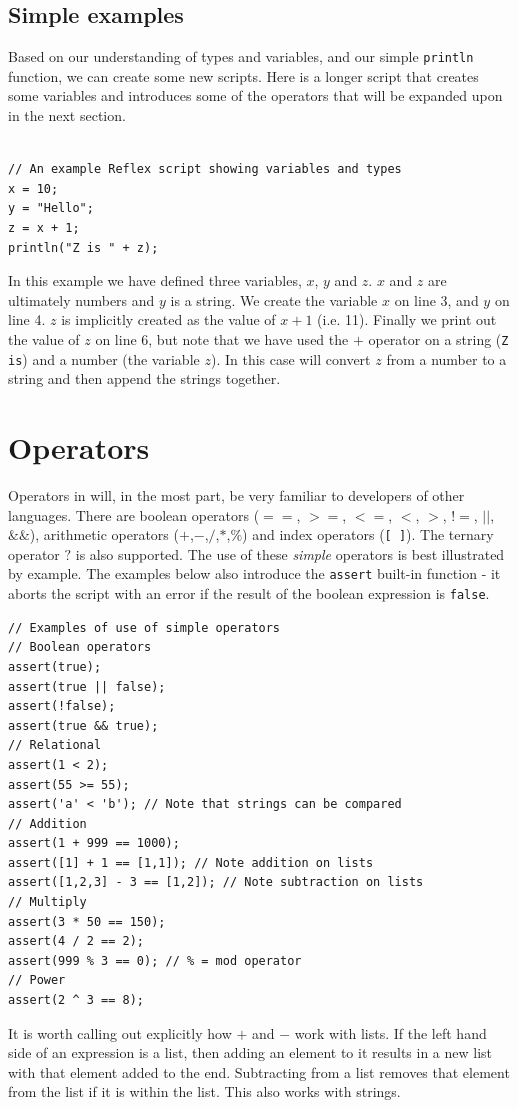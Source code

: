 \section{Simple examples}
Based on our understanding of types and variables, and our simple \verb+println+ function, we can create some new \Reflex scripts. Here is a longer script that creates some variables and introduces some of the operators that will be expanded upon in the next section.

\begin{lstlisting}[caption={Variables and Types}]

// An example Reflex script showing variables and types
x = 10;
y = "Hello";
z = x + 1;
println("Z is " + z);
\end{lstlisting}

In this example we have defined three variables, $x$, $y$ and $z$. $x$ and $z$ are ultimately numbers and $y$ is a string. We create the variable $x$ on line 3, and $y$ on line 4. $z$ is implicitly created as the value of $x+1$ (i.e. 11). Finally we print out the value of $z$ on line 6, but note that we have used the $+$ operator on a string (\verb+Z is+) and a number (the variable $z$). In this case \Reflex will convert $z$ from a number to a string and then append the strings together.

\chapter{Operators}
Operators  in \Reflex will, in the most part, be very familiar to developers of other languages. There are boolean  operators ($==$, $>=$, $<=$, $<$, $>$, $!=$, $||$, $\&\&$), arithmetic  operators ($+$,$-$,$/$,$*$,$\%$) and index  operators (\verb+[ ]+). The ternary  operator $?$ is also supported. The use of these \emph{simple} operators is best illustrated by example. The examples below also introduce the \verb+assert+ built-in function - it aborts the \Reflex script with an error if the result of the boolean expression is \verb+false+.
\begin{lstlisting}[caption={Simple operators}]
// Examples of use of simple operators
// Boolean operators
assert(true);
assert(true || false);
assert(!false);
assert(true && true);
// Relational
assert(1 < 2);
assert(55 >= 55);
assert('a' < 'b'); // Note that strings can be compared
// Addition
assert(1 + 999 == 1000);
assert([1] + 1 == [1,1]); // Note addition on lists
assert([1,2,3] - 3 == [1,2]); // Note subtraction on lists
// Multiply
assert(3 * 50 == 150);
assert(4 / 2 == 2);
assert(999 % 3 == 0); // % = mod operator
// Power
assert(2 ^ 3 == 8);
\end{lstlisting}
It is worth calling out explicitly how $+$ and $-$ work with lists. If the left hand side of an expression is a list, then adding an element to it results in a new list with that element added to the end. Subtracting from a list removes that element from the list if it is within the list. This also works with strings.

